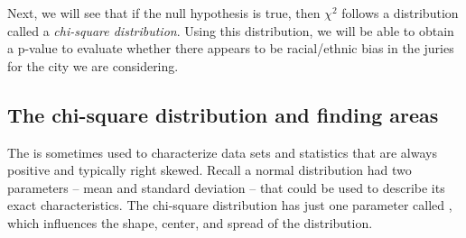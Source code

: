 Next, we will see that if the null hypothesis is true, then $\chi^2$ follows a distribution called a \emph{chi-square distribution}. Using this distribution, we will be able to obtain a p-value to evaluate whether there appears to be racial/ethnic bias in the juries for the city we are considering.



\subsection{The chi-square distribution and finding areas}

The  is sometimes used to characterize data sets and statistics that are always positive and typically right skewed. Recall a normal distribution had two parameters -- mean and standard deviation -- that could be used to describe its exact characteristics. The chi-square distribution has just one parameter called , which influences the shape, center, and spread of the distribution.

%

